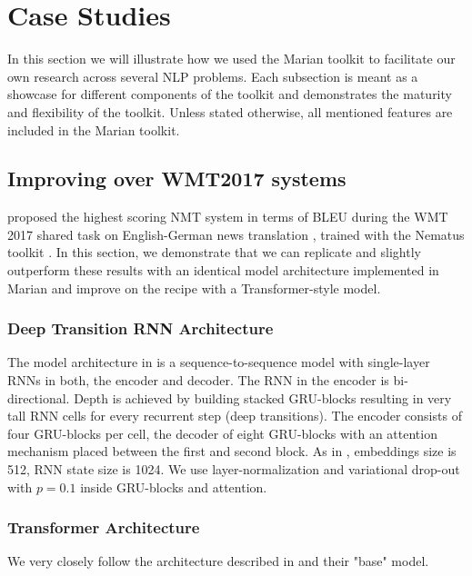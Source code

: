 \documentclass[11pt,a4paper]{article}
\begin{document}
\section{Case Studies}\label{case}
In this section we will illustrate how we used the Marian toolkit to facilitate our own research across several NLP problems. 
Each subsection is meant as a showcase for different components of the toolkit and demonstrates the maturity and flexibility of the toolkit. Unless stated otherwise, all mentioned features are included in the Marian toolkit.  

\subsection{Improving over WMT2017 systems}

 proposed the highest scoring NMT system in terms of BLEU during the WMT 2017 shared task on English-German news translation \cite{DBLP:conf/wmt/2017}, trained with the Nematus toolkit \cite{sennrich-EtAl:2017:EACLDemo}. In this section, we demonstrate that we can replicate and slightly outperform these results with an identical model architecture implemented in Marian and improve on the recipe with a Transformer-style \cite{NIPS2017_7181} model. 

\subsubsection{Deep Transition RNN Architecture}

The model architecture in  is a sequence-to-sequence model with single-layer RNNs in both, the encoder and decoder. The RNN in the encoder is bi-directional. Depth is achieved by building stacked GRU-blocks resulting in very tall RNN cells for every recurrent step (deep transitions). The encoder consists of four GRU-blocks per cell, the decoder of eight GRU-blocks with an attention mechanism placed between the first and second block. As in , embeddings size is 512, RNN state size is 1024. We use layer-normalization \cite{ba2016layer} and variational drop-out with $p=0.1$ \cite{gal2016theoretically} inside GRU-blocks and attention.

\subsubsection{Transformer Architecture}
We very closely follow the architecture described in  and their "base" model. 
\end{document}
